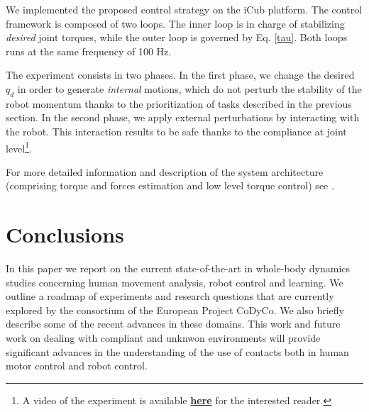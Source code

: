 \documentclass[final,5p,twocolumn]{elsarticle}
\begin{document}

We implemented the proposed control strategy on the iCub platform. The control framework is composed of two
loops. The inner loop is in charge of stabilizing \emph{desired} joint torques, while the outer loop is governed by 
Eq. \eqref{tau}. Both loops runs at the same frequency of 100 Hz. 

The experiment consists in two phases. In the first phase, we change the desired $q_d$ in order to generate 
\emph{internal} motions, which do not perturb the stability of the robot momentum thanks to the prioritization of tasks
described in the previous section. In the second phase, we apply external perturbations by interacting with the robot. This 
interaction  results to be safe thanks to the compliance at joint level\footnote{A video of the experiment is available \href{https://www.youtube.com/watch?v=VrPBSSQEr3A}{\textbf{here}} for the interested reader.}.

For more detailed information and description of the system architecture (comprising torque and forces estimation and low level torque control) see \cite{noriFrontiers2015}.

\section{Conclusions}

In this paper we report on the current state-of-the-art in whole-body dynamics studies concerning human movement analysis, robot control and learning. We outline a roadmap of 
experiments  and  research  questions  that  are  currently  explored  by  the  consortium  of the European Project CoDyCo. We also briefly describe some of the recent advances in these domains. This work and future work on dealing with compliant and unknwon environments will provide significant advances in the understanding of the use of contacts both in human motor control and robot control.
\end{document}
